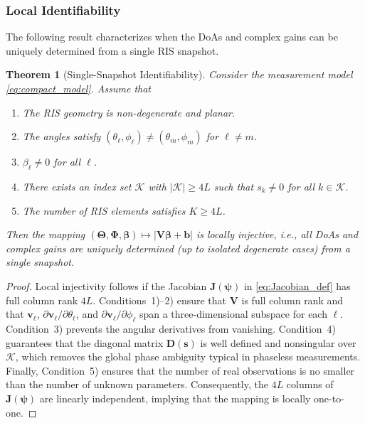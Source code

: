 \documentclass[journal]{IEEEtran}
\newtheorem{theorem}{Theorem}
\begin{document}
\subsubsection{Local Identifiability}

The following result characterizes when the DoAs and complex gains
can be uniquely determined from a single RIS snapshot.

\begin{theorem}[Single-Snapshot Identifiability]
\label{thm:identifiability}
Consider the measurement model \eqref{eq:compact_model}.
Assume that

\begin{enumerate}
\item The RIS geometry is non-degenerate and planar.
\item The angles satisfy
$(\theta_\ell,\phi_\ell)\neq(\theta_m,\phi_m)$ for $\ell\neq m$.
\item $\beta_\ell\neq 0$ for all $\ell$.
\item There exists an index set $\mathcal K$ with
$|\mathcal K|\ge 4L$ such that
$s_k\neq 0$ for all $k\in\mathcal K$.
\item The number of RIS elements satisfies $K\ge 4L$.
\end{enumerate}

Then the mapping
$(\boldsymbol\Theta,\boldsymbol\Phi,\boldsymbol\beta)
\mapsto
|\mathbf V\boldsymbol\beta+\mathbf b|$
is locally injective, i.e.,
all DoAs and complex gains are uniquely determined (up to isolated
degenerate cases) from a single snapshot.
\end{theorem}

\begin{proof}
Local injectivity follows if the Jacobian
$\mathbf J(\boldsymbol\psi)$ in \eqref{eq:Jacobian_def}
has full column rank $4L$.
Conditions~1)--2) ensure that
$\mathbf V$ is full column rank and that
$\mathbf v_\ell$,
$\partial\mathbf v_\ell/\partial\theta_\ell$,
and
$\partial\mathbf v_\ell/\partial\phi_\ell$
span a three-dimensional subspace for each $\ell$.
Condition~3) prevents the angular derivatives from vanishing.
Condition~4) guarantees that the diagonal matrix
$\mathbf D(\mathbf s)$ is well defined and nonsingular over
$\mathcal K$, which removes the global phase ambiguity typical in
phaseless measurements.
Finally, Condition~5) ensures that the number of real observations
is no smaller than the number of unknown parameters.
Consequently, the $4L$ columns of $\mathbf J(\boldsymbol\psi)$ are
linearly independent, implying that the mapping is locally one-to-one.
\end{proof}
\end{document}
